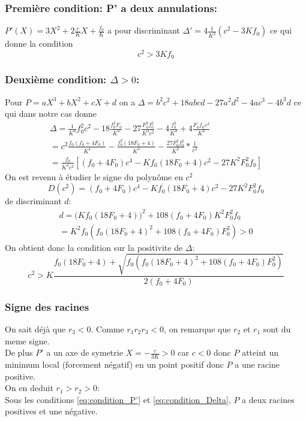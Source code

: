\subsubsection{Première condition: P' a deux annulations:}
$P'(X)= 3X^2+ 2\frac{c}{K}X+ \frac{f_0}{K}$ a pour discriminant $\Delta'=4\frac{1}{K^2}(c^2-3Kf_0)$ ce qui donne la condition \begin{equation} \label{eq:condition_P'}
	\boxed{c^2 >3K f_0
	}
\end{equation}
\subsubsection{Deuxième condition: $\Delta>0$:}
Pour $P=aX^3 +bX^2 + cX + d$ on a $\Delta= b^2c^2 +18abcd-27a^2d^2 -4ac^3 -4b^3d$ ce qui dans notre cas donne
\begin{align*}
	\Delta=\frac{1}{K^4}f_0^2c^2 -18 \frac{f_0^2F_0}{K^3}-27 \frac{F_0^2 f_0^2}{K^2c^2} - 4 \frac{f_0^3}{K^3}+4 \frac{F_0f_0c^2}{K^4} \\ = c^2 \frac{f_0(f_0+4F_0)}{K^4}- \frac{f_0^2(18F_0+4)}{K^3} -\frac{27F_0^2f_0^2}{K^2}* \frac{1}{c^2}\\ 
=	\frac{f_0}{K^4c^2}[(f_0+4F_0)c^4-Kf_0(18F_0+4) c^2 - 27 K^2F_0^2f_0] \end{align*}
On est revenu à étudier le signe du polynôme en $c^2$ \begin{equation}
	D(c^2)=(f_0+4F_0)c^4-Kf_0(18F_0+4)c^2 - 27 K^2F_0^2f_0
\end{equation} 
de discriminant $d$:
\begin{align*}
	d=\Big(Kf_0(18F_0+4) \Big)^2 +108(f_0+4F_0)K^2F_0^2f_0 \\ 
	= K^2f_0(f_0(18F_0+4)^2+108(f_0+4F_0)F_0^2) >0
\end{align*}
On obtient donc la condition sur la positivite de $\Delta$: 
\begin{equation}\boxed{
	c^2> K\frac{f_0(18F_0+4)+\sqrt{f_0(f_0(18F_0+4)^2+108(f_0+4F_0)F_0^2)}}{2(f_0+4F_0)}
	}\label{eq:condition_Delta}
\end{equation}
\subsubsection{Signe des racines}
On sait déjà que $r_3<0$. Comme $r_1r_2r_3<0$, on remarque que $r_2$ et $r_1$ sont du meme signe.\\
De plus $P'$ a un axe de symetrie $X=-\frac{c}{3K}>0$ car $c<0$ donc $P$ atteint un minimum local (forcement négatif) en un point positif donc $P$ a une racine positive.\\
On en deduit $r_1>r_2>0$: \\ 
Sous les conditions \eqref{eq:condition_P'} et \eqref{eq:condition_Delta}, $P$ a deux racines positives et une négative.
